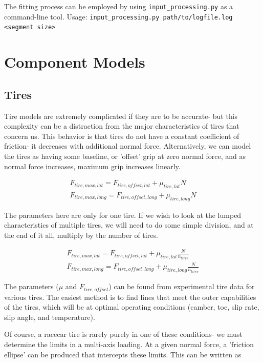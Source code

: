 \documentclass{article}
\begin{document}
The fitting process can be employed by using \texttt{input\_processing.py} as a command-line tool. Usage: \texttt{input\_processing.py path/to/logfile.log <segment size>}

\section{Component Models}

\subsection{Tires}

Tire models are extremely complicated if they are to be accurate- but this complexity can be a distraction from the major characteristics of tires that concern us. This behavior is that tires do not have a constant coefficient of friction- it decreases with additional normal force. Alternatively, we can model the tires as having some baseline, or 'offset' grip at zero normal force, and as normal force increases, maximum grip increases linearly.

\begin{align}
	F_{tire,max,lat} = F_{tire,offset,lat} + \mu_{tire,lat} N \\
	F_{tire,max,long} = F_{tire,offset,long} + \mu_{tire,long} N
\end{align}

The parameters here are only for one tire. If we wish to look at the lumped characteristics of multiple tires, we will need to do some simple division, and at the end of it all, multiply by the number of tires.

\begin{align}
	F_{tire,max,lat} = F_{tire,offset,lat} + \mu_{tire,lat} \frac{N}{n_{tires}} \\
	F_{tire,max,long} = F_{tire,offset,long} + \mu_{tire,long} \frac{N}{n_{tires}}
\end{align}

The parameters ($\mu$ and $F_{tire,offset}$) can be found from experimental tire data for various tires. The easiest method is to find lines that meet the outer capabilities of the tires, which will be at optimal operating conditions (camber, toe, slip rate, slip angle, and temperature).

Of course, a racecar tire is rarely purely in one of these conditions- we must determine the limits in a multi-axis loading. At a given normal force, a 'friction ellipse' can be produced that intercepts these limits. This can be written as
\end{document}
